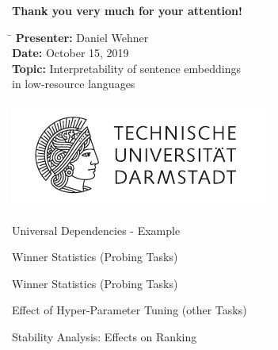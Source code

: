 \documentclass[accentcolor=tud1a,colorbacktitle,inverttitle,landscape,german,presentation,t]{tudbeamer}
\begin{document}
\begin{frame}[plain]
	\vfill\centering
	\begin{tcolorbox}[width=4in,interior hidden,boxsep=5pt,left=0pt,right=0pt,top=2mm,
		bottom=2mm,sharp corners,colback=tud1a!40,colframe=tud1a]%
		\centering
		\Large\textbf{Thank you very much for your attention!}
	\end{tcolorbox}
	\vfill
	\begin{center}\parbox{0cm}{
	{\footnotesize
	\begin{tabbing}
		\hspace*{3.5cm}\=\kill
		\textbf{Presenter:} 	\>	Daniel Wehner 						\\[2mm]
		\textbf{Date:}		\>	October 15, 2019 					\\[2mm]
		\textbf{Topic:}		\>	Interpretability of sentence embeddings 	\\
						\>	in low-resource languages 				\\
	\end{tabbing}}}
	\end{center}
	\vfill
	\centering
	\includegraphics[scale=0.8]{tud_logo}
	\vfill
\end{frame}

\begin{frame}{Universal Dependencies - Example}{}
	
\end{frame}

\begin{frame}{Winner Statistics (Probing Tasks)}{}
	\vspace*{-7mm}
	
\end{frame}

\begin{frame}{Winner Statistics (Probing Tasks)}{}
	\vspace*{-7mm}
	
\end{frame}

\begin{frame}{Effect of Hyper-Parameter Tuning (other Tasks)}{}
	
\end{frame}

\begin{frame}{Stability Analysis: Effects on Ranking}{}
	\vspace*{-8mm}
	
\end{frame}
\end{document}
